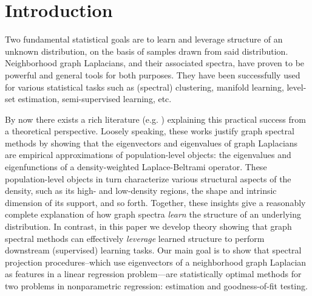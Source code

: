 \section{Introduction}
\label{sec:introduction}
Two fundamental statistical goals are to learn and leverage structure of an unknown distribution, on the basis of samples drawn from said distribution. Neighborhood graph Laplacians, and their associated spectra, have proven to be powerful and general tools for both purposes. They have been successfully used for various statistical tasks such as (spectral) clustering, manifold learning, level-set estimation, semi-supervised learning, etc.

By now there exists a rich literature (e.g. \citep{koltchinskii2000,belkin07,vonluxburg2008,burago2014,shi2015,singer2017,garciatrillos18,trillos2019, calder2019, cheng2021,dunson2021}) explaining this practical success from a theoretical perspective. Loosely speaking, these works justify graph spectral methods by showing that the eigenvectors and eigenvalues of graph Laplacians are empirical approximations of population-level objects: the eigenvalues and eigenfunctions of a density-weighted Laplace-Beltrami operator. These population-level objects in turn characterize various structural aspects of the density, such as its high- and low-density regions, the shape and intrinsic dimension of its support, and so forth. Together, these insights give a reasonably complete explanation of how graph spectra \emph{learn} the structure of an underlying distribution. In contrast, in this paper we develop theory showing that graph spectral methods can effectively \emph{leverage} learned structure to perform downstream (supervised) learning tasks. Our main goal is to show that spectral projection procedures--which use eigenvectors of a neighborhood graph Laplacian as features in a linear regression problem---are statistically optimal methods for two problems in nonparametric regression: estimation and goodness-of-fit testing.

